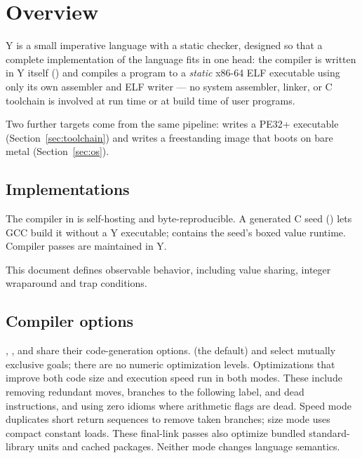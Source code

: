 \section{Overview}
\label{sec:overview}

\textsf{Y} is a small imperative language with a static checker, designed
so that a complete implementation of the language fits in one head: the
compiler is written in \textsf{Y} itself () and compiles a
program to a \emph{static} x86-64 ELF executable using only
its own assembler and ELF writer --- no system assembler, linker, or C
toolchain is involved at run time or at build time of user programs.

Two further targets come from the same pipeline: 
writes a PE32+ executable (Section~\ref{sec:toolchain}) and
 writes a freestanding image that boots on bare metal
(Section~\ref{sec:os}).

\subsection*{Implementations}

The compiler in  is self-hosting and byte-reproducible.
A generated C seed () lets GCC build it without a Y
executable;  contains the seed's boxed value runtime.
Compiler passes are maintained in Y.

This document defines observable behavior, including value sharing,
integer wraparound and trap conditions.

\subsection*{Compiler options}

, , and
 share their code-generation options.
 (the default) and  select mutually
exclusive goals; there are no numeric optimization levels. Optimizations that
improve both code size and execution speed run in both modes. These include
removing redundant moves, branches to the following label, and dead instructions,
and using zero idioms where arithmetic flags are dead. Speed mode duplicates
short return sequences to remove taken branches; size mode uses compact
constant loads. These final-link passes also optimize bundled standard-library
units and cached packages. Neither mode changes language semantics.


